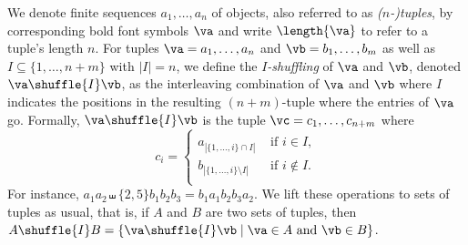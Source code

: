 \medskip {}
    We denote finite sequences $a_1, \ldots, a_n$ of objects, also referred to as \emph{($n$-)tuples}, by corresponding bold font symbols $\va$ and write $\length{\va}$ to refer to a tuple's length $n$.  
	For tuples $\va = a_1,\ldots,a_n$ and $\vb = b_1,\ldots,b_m$ as well as $I \subseteq \{1,\ldots,n+m\}$ with $|I|=n$, we define the \emph{$I$-shuffling} of $\va$ and $\vb$, denoted $\va \shuffle{I} \vb$,
	as the interleaving combination of $\va$ and $\vb$ where $I$ indicates the positions in the resulting $(n+m)$-tuple where the entries of $\va$ go. Formally, $\va \shuffle{I} \vb$ is the tuple
	$\vc = c_1,\ldots,c_{n+m}$ where
	$$
	c_i = \begin{cases}\\[-3.7ex]
	a_{|\{1,\ldots,i\} \cap I|} & \text{ if } i \in I,\\[-0.5ex]
	b_{|\{1,\ldots,i\} \setminus I|} & \text{ if } i \not\in I.\\
	\end{cases}
	$$
For instance, $a_1a_2 \shuffle{\{2,5\}} b_1b_2b_3 = b_1a_1b_2b_3a_2$. We lift these operations to sets of tuples as usual, that is, if $A$ and $B$ are two sets of tuples, then $A \shuffle{I} B = \{ \va \shuffle{I} \vb \mid \va\in A \text{ and } \vb\in B\}$. 

